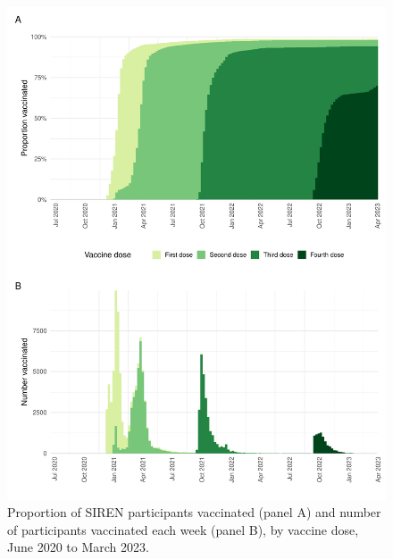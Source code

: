 \begin{figure}[htbp!]
    \centering
    \includegraphics[width=\textwidth]{proportion_vaccinated.pdf}
    \caption[Proportion of SIREN participants vaccinated and number of participants vaccinated each week, by vaccine dose, June 2020 to March 2023]{Proportion of SIREN participants vaccinated (panel A) and number of participants vaccinated each week (panel B), by vaccine dose, June 2020 to March 2023.}\label{fig:prop_vaccinated}
\end{figure}

